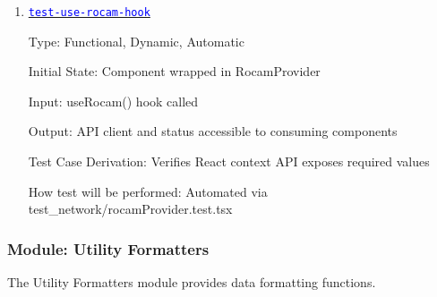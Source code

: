 \documentclass[12pt, titlepage]{article}
\newcommand{\tid}[1]{\hyperlink{tid:#1}{\textcolor{blue}{\texttt{#1}}}}
\begin{document}
\begin{enumerate}
        Output: Status state updated; polling continues with proper cleanup on unmount

        Test Case Derivation: Verifies FR-10 (real-time status updates via SSE)

        How test will be performed: Automated via test\_network/rocamProvider.test.tsx

  \item{\tid{test-use-rocam-hook}\\}

        Type: Functional, Dynamic, Automatic

        Initial State: Component wrapped in RocamProvider

        Input: useRocam() hook called

        Output: API client and status accessible to consuming components

        Test Case Derivation: Verifies React context API exposes required values

        How test will be performed: Automated via test\_network/rocamProvider.test.tsx

\end{enumerate}

\subsubsection{Module: Utility Formatters}

The Utility Formatters module provides data formatting functions.
\end{document}
